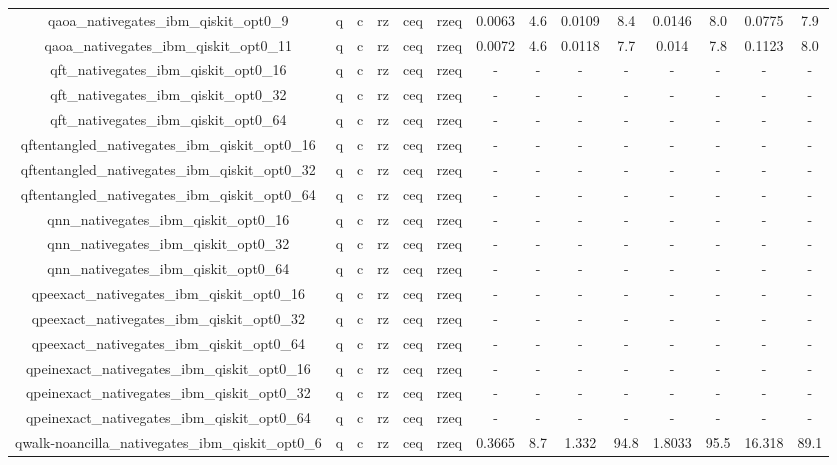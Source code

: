 \begin{table}[htb]
{\begin{tabular}{|c|c|c|c|c|c|c|c|c|c|c|c|c|c|}
qaoa_nativegates_ibm_qiskit_opt0_9 & q & c & rz & ceq & rzeq & 0.0063 & 4.6 & 0.0109 & 8.4 & 0.0146 & 8.0 & 0.0775 & 7.9 \\ 
qaoa_nativegates_ibm_qiskit_opt0_11 & q & c & rz & ceq & rzeq & 0.0072 & 4.6 & 0.0118 & 7.7 & 0.014 & 7.8 & 0.1123 & 8.0 \\ 
qft_nativegates_ibm_qiskit_opt0_16 & q & c & rz & ceq & rzeq & - & - & - & - & - & - & - & - \\ 
qft_nativegates_ibm_qiskit_opt0_32 & q & c & rz & ceq & rzeq & - & - & - & - & - & - & - & - \\ 
qft_nativegates_ibm_qiskit_opt0_64 & q & c & rz & ceq & rzeq & - & - & - & - & - & - & - & - \\ 
qftentangled_nativegates_ibm_qiskit_opt0_16 & q & c & rz & ceq & rzeq & - & - & - & - & - & - & - & - \\ 
qftentangled_nativegates_ibm_qiskit_opt0_32 & q & c & rz & ceq & rzeq & - & - & - & - & - & - & - & - \\ 
qftentangled_nativegates_ibm_qiskit_opt0_64 & q & c & rz & ceq & rzeq & - & - & - & - & - & - & - & - \\ 
qnn_nativegates_ibm_qiskit_opt0_16 & q & c & rz & ceq & rzeq & - & - & - & - & - & - & - & - \\ 
qnn_nativegates_ibm_qiskit_opt0_32 & q & c & rz & ceq & rzeq & - & - & - & - & - & - & - & - \\ 
qnn_nativegates_ibm_qiskit_opt0_64 & q & c & rz & ceq & rzeq & - & - & - & - & - & - & - & - \\ 
qpeexact_nativegates_ibm_qiskit_opt0_16 & q & c & rz & ceq & rzeq & - & - & - & - & - & - & - & - \\ 
qpeexact_nativegates_ibm_qiskit_opt0_32 & q & c & rz & ceq & rzeq & - & - & - & - & - & - & - & - \\ 
qpeexact_nativegates_ibm_qiskit_opt0_64 & q & c & rz & ceq & rzeq & - & - & - & - & - & - & - & - \\ 
qpeinexact_nativegates_ibm_qiskit_opt0_16 & q & c & rz & ceq & rzeq & - & - & - & - & - & - & - & - \\ 
qpeinexact_nativegates_ibm_qiskit_opt0_32 & q & c & rz & ceq & rzeq & - & - & - & - & - & - & - & - \\ 
qpeinexact_nativegates_ibm_qiskit_opt0_64 & q & c & rz & ceq & rzeq & - & - & - & - & - & - & - & - \\ 
qwalk-noancilla_nativegates_ibm_qiskit_opt0_6 & q & c & rz & ceq & rzeq & 0.3665 & 8.7 & 1.332 & 94.8 & 1.8033 & 95.5 & 16.318 & 89.1 \\ 

\end{tabular}}
\end{table}

